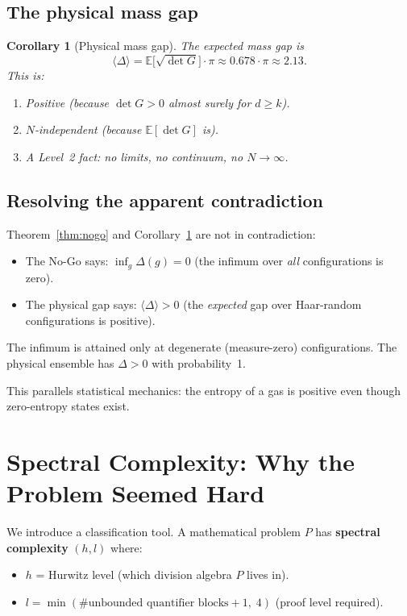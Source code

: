 \documentclass[12pt]{article}
\newtheorem{corollary}[theorem]{Corollary}
\theoremstyle{definition}
\theoremstyle{remark}
\begin{document}
\subsection{The physical mass gap}

\begin{corollary}[Physical mass gap]\label{cor:phys}
The expected mass gap is
\[
  \langle\Delta\rangle
  = \mathbb{E}\!\big[\sqrt{\det G}\big] \cdot \pi
  \approx 0.678 \cdot \pi
  \approx 2.13.
\]
This is:
\begin{enumerate}
\item Positive (because $\det G > 0$ almost surely for $d \ge k$).
\item $N$-independent (because $\mathbb{E}[\det G]$ is).
\item A Level~2 fact: no limits, no continuum, no $N \to \infty$.
\end{enumerate}
\end{corollary}

\subsection{Resolving the apparent contradiction}

Theorem~\ref{thm:nogo} and Corollary~\ref{cor:phys} are not in
contradiction:
\begin{itemize}
\item The No-Go says: $\inf_g \Delta(g) = 0$
  (the infimum over \emph{all} configurations is zero).
\item The physical gap says: $\langle\Delta\rangle > 0$
  (the \emph{expected} gap over Haar-random configurations is positive).
\end{itemize}
The infimum is attained only at degenerate (measure-zero) configurations.
The physical ensemble has $\Delta > 0$ with probability~1.

This parallels statistical mechanics: the entropy of a gas is
positive even though zero-entropy states exist.

\section{Spectral Complexity: Why the Problem Seemed Hard}

We introduce a classification tool. A mathematical
problem $P$ has \textbf{spectral complexity} $(h, l)$ where:
\begin{itemize}
\item $h$ = Hurwitz level (which division algebra $P$ lives in).
\item $l = \min(\text{\# unbounded quantifier blocks} + 1,\; 4)$
  (proof level required).
\end{itemize}
\end{document}

